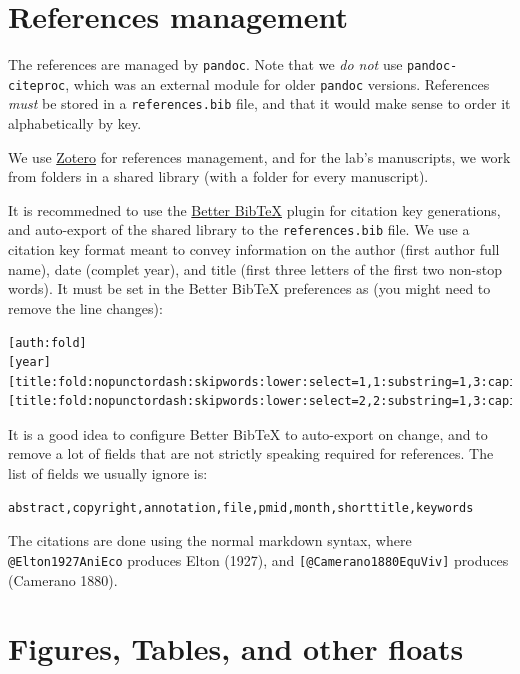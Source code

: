 \documentclass[11pt]{article}
\begin{document}
\hypertarget{references-management}{%
\section{References management}\label{references-management}}

The references are managed by \texttt{pandoc}. Note that we \emph{do
not} use \texttt{pandoc-citeproc}, which was an external module for
older \texttt{pandoc} versions. References \emph{must} be stored in a
\texttt{references.bib} file, and that it would make sense to order it
alphabetically by key.

We use \href{https://www.zotero.org/}{Zotero} for references management,
and for the lab's manuscripts, we work from folders in a shared library
(with a folder for every manuscript).

It is recommedned to use the
\href{https://retorque.re/zotero-better-bibtex/}{Better BibTeX} plugin
for citation key generations, and auto-export of the shared library to
the \texttt{references.bib} file. We use a citation key format meant to
convey information on the author (first author full name), date (complet
year), and title (first three letters of the first two non-stop words).
It must be set in the Better BibTeX preferences as (you might need to
remove the line changes):

\begin{verbatim}
[auth:fold]
[year]
[title:fold:nopunctordash:skipwords:lower:select=1,1:substring=1,3:capitalize]
[title:fold:nopunctordash:skipwords:lower:select=2,2:substring=1,3:capitalize]
\end{verbatim}

It is a good idea to configure Better BibTeX to auto-export on change,
and to remove a lot of fields that are not strictly speaking required
for references. The list of fields we usually ignore is:

\begin{verbatim}
abstract,copyright,annotation,file,pmid,month,shorttitle,keywords
\end{verbatim}

The citations are done using the normal markdown syntax, where
\texttt{@Elton1927AniEco} produces Elton (1927), and
\texttt{{[}@Camerano1880EquViv{]}} produces (Camerano 1880).

\hypertarget{figures-tables-and-other-floats}{%
\section{Figures, Tables, and other
floats}\label{figures-tables-and-other-floats}}
\end{document}
